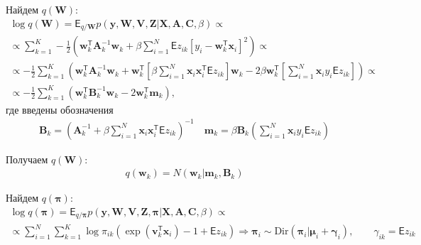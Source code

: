 \documentclass[12pt, twoside]{article}
\numberwithin{equation}{section}
\begin{document}
Найдем $q\left(\textbf{W}\right)$:
\begin{equation}
\label{eq:st:32}
\begin{aligned}
\log q\left(\textbf{W}\right) =\mathsf{E}_{q/\textbf{W}}p\left(\textbf{y}, \textbf{W}, \textbf{V}, \textbf{Z}|\textbf{X}, \textbf{A}, \textbf{C}, \beta\right) \propto \\
\propto \sum_{k=1}^{K}-\frac{1}{2}\left(\textbf{w}_k^{\mathsf{T}}\textbf{A}_k^{-1}\textbf{w}_k + \beta\sum_{i=1}^{N}\mathsf{E}z_{ik}\left[y_i -\textbf{w}_k^{\mathsf{T}}\textbf{x}_i\right]^2\right) \propto \\
\propto -\frac{1}{2}\sum_{k=1}^{K}\left(\textbf{w}_k^{\mathsf{T}}\textbf{A}_k^{-1}\textbf{w}_k + \textbf{w}_k^{\mathsf{T}}\left[\beta\sum_{i=1}^{N}\textbf{x}_i\textbf{x}_i^{\mathsf{T}}\mathsf{E}z_{ik}\right]\textbf{w}_k -2\beta\textbf{w}_k^{\mathsf{T}}\left[\sum_{i=1}^{N}\textbf{x}_iy_i\mathsf{E}z_{ik}\right]\right) \propto \\
\propto -\frac{1}{2}\sum_{k=1}^{K}\left(\textbf{w}_k^{\mathsf{T}}\textbf{B}_k^{-1}\textbf{w}_k - 2\textbf{w}_k^{\mathsf{T}}\textbf{m}_k \right),
\end{aligned}
\end{equation}
где введены обозначения
\begin{equation}
\label{eq:st:33}
\begin{aligned}
\textbf{B}_k = \left(\textbf{A}_k^{-1} + \beta\sum_{i=1}^{N}\textbf{x}_i\textbf{x}_i^{\mathsf{T}}\mathsf{E}z_{ik}\right)^{-1} \quad \textbf{m}_k = \beta\textbf{B}_k\left(\sum_{i=1}^{N}\textbf{x}_iy_i\mathsf{E}z_{ik} \right)
\end{aligned}
\end{equation}

Получаем  $q\left(\textbf{W}\right)$:
\begin{equation}
\label{eq:st:34}
\begin{aligned}
q(\textbf{w}_k) = N(\textbf{w}_k|\textbf{m}_k, \textbf{B}_k)
\end{aligned}
\end{equation}

Найдем $q\left(\bm{\pi}\right)$:
\begin{equation}
\label{eq:st:35}
\begin{aligned}
\log q\left(\bm{\pi}\right) =\mathsf{E}_{q/\bm{\pi}}p\left(\textbf{y}, \textbf{W}, \textbf{V}, \textbf{Z}, \bm{\pi}|\textbf{X}, \textbf{A}, \textbf{C}, \beta\right) \propto \\
\propto \sum_{i=1}^{N}\sum_{k=1}^{K}\log\pi_{ik}\left(\exp\left(\textbf{v}_{k}^{\mathsf{T}}\textbf{x}_i\right) - 1 +\mathsf{E}z_{ik}\right) \Rightarrow \bm{\pi}_i \sim \text{Dir}\left(\bm{\pi}_i|\bm{\mu}_i+\bm{\gamma}_i\right), \qquad \gamma_{ik} = \mathsf{E}z_{ik}
\end{aligned}
\end{equation}
\end{document}
